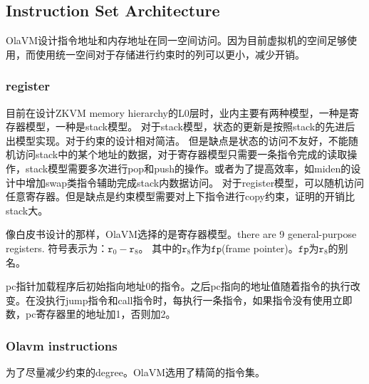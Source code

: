 \subsection{Instruction Set Architecture}\label{subsec: processor-instructions-executor}
OlaVM设计指令地址和内存地址在同一空间访问。因为目前虚拟机的空间足够使用，而使用统一空间对于存储进行约束时的列可以更小，减少开销。

\subsubsection{register}\label{subsec: processor-register}
目前在设计ZKVM memory hierarchy的L0层时，业内主要有两种模型，一种是寄存器模型，一种是stack模型。
对于stack模型，状态的更新是按照stack的先进后出模型实现。对于约束的设计相对简洁。
但是缺点是状态的访问不友好，不能随机访问stack中的某个地址的数据，对于寄存器模型只需要一条指令完成的读取操作，stack模型需要多次进行pop和push的操作。或者为了提高效率，如miden的设计中增加swap类指令辅助完成stack内数据访问。
对于register模型，可以随机访问任意寄存器。但是缺点是约束模型需要对上下指令进行copy约束，证明的开销比stack大。

像白皮书设计的那样，OlaVM选择的是寄存器模型。there are 9 general-purpose registers.
符号表示为：$\texttt{r}_0 - \texttt{r}_{8}$。
其中的$\texttt{r}_{8}$作为$\texttt{fp}$(frame pointer)。$\texttt{fp}$为$\texttt{r}_{8}$的别名。

pc指针加载程序后初始指向地址0的指令。之后pc指向的地址值随着指令的执行改变。在没执行jump指令和call指令时，每执行一条指令，如果指令没有使用立即数，pc寄存器里的地址加1，否则加2。

\subsubsection{Olavm instructions}\label{subsec: processor-instructions-executor-instructions}
为了尽量减少约束的degree。OlaVM选用了精简的指令集。

